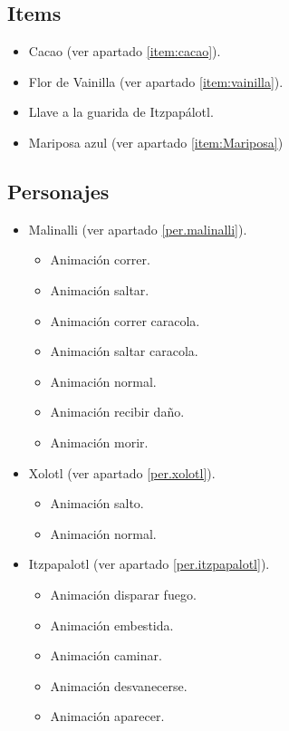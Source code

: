 \begin{itemize}
        \subsection{Items}
                \begin{itemize}
                        \item   Cacao (ver apartado \ref{item:cacao}).
                        \item Flor de Vainilla (ver apartado \ref{item:vainilla}).
                        \item Llave a la guarida de Itzpapálotl.
                        \item Mariposa azul (ver apartado \ref{item:Mariposa})
                \end{itemize}
        \subsection{Personajes}
        \begin{itemize}
                \item Malinalli (ver apartado \ref{per.malinalli}).
                \begin{itemize}
                        \item Animación correr.
                        \item Animación saltar.
                        \item Animación correr caracola.
                        \item Animación saltar caracola.
                        \item Animación normal.
                        \item Animación recibir daño.
						\item Animación morir.
                \end{itemize}
                \item Xolotl (ver apartado \ref{per.xolotl}).
                	\begin{itemize}
						\item Animación salto.
						\item Animación normal.
					\end{itemize}
                \item Itzpapalotl (ver apartado \ref{per.itzpapalotl}).
                \begin{itemize}
                        \item Animación disparar fuego.
                        \item Animación embestida.
                        \item Animación caminar.
                        \item Animación desvanecerse.
                        \item Animación aparecer.
                \end{itemize}
        \end{itemize}

\end{itemize}
